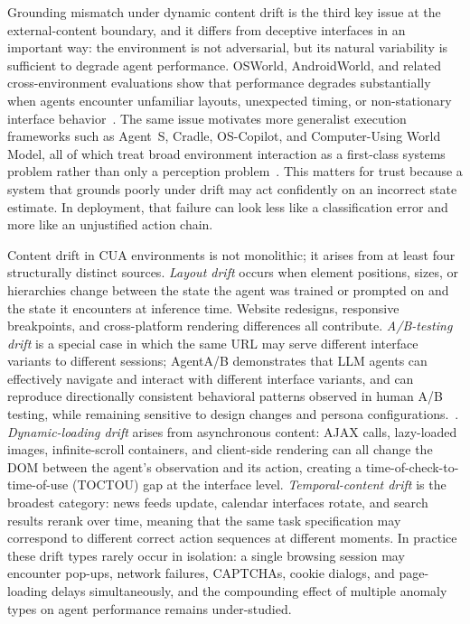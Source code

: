 Grounding mismatch under dynamic content drift is the third key issue at the external-content boundary, and it differs from deceptive interfaces in an important way: the environment is not adversarial, but its natural variability is sufficient to degrade agent performance. OSWorld, AndroidWorld, and related cross-environment evaluations show that performance degrades substantially when agents encounter unfamiliar layouts, unexpected timing, or non-stationary interface behavior~\cite{osworld2024,androidworld2024}. The same issue motivates more generalist execution frameworks such as Agent~S, Cradle, OS-Copilot, and Computer-Using World Model, all of which treat broad environment interaction as a first-class systems problem rather than only a perception problem~\cite{agents2024,cradle2024,oscopilot2024,cuwm2026}. This matters for trust because a system that grounds poorly under drift may act confidently on an incorrect state estimate. In deployment, that failure can look less like a classification error and more like an unjustified action chain.

Content drift in CUA environments is not monolithic; it arises from at least four structurally distinct sources. \emph{Layout drift} occurs when element positions, sizes, or hierarchies change between the state the agent was trained or prompted on and the state it encounters at inference time. Website redesigns, responsive breakpoints, and cross-platform rendering differences all contribute. \emph{A/B-testing drift} is a special case in which the same URL may serve different interface variants to different sessions; AgentA/B demonstrates that LLM agents can effectively navigate and interact with different interface variants, and can reproduce directionally consistent behavioral patterns observed in human A/B testing, while remaining sensitive to design changes and persona configurations.~\cite{agentab2025}. \emph{Dynamic-loading drift} arises from asynchronous content: AJAX calls, lazy-loaded images, infinite-scroll containers, and client-side rendering can all change the DOM between the agent's observation and its action, creating a time-of-check-to-time-of-use (TOCTOU) gap at the interface level. \emph{Temporal-content drift} is the broadest category: news feeds update, calendar interfaces rotate, and search results rerank over time, meaning that the same task specification may correspond to different correct action sequences at different moments. In practice these drift types rarely occur in isolation: a single browsing session may encounter pop-ups, network failures, CAPTCHAs, cookie dialogs, and page-loading delays simultaneously, and the compounding effect of multiple anomaly types on agent performance remains under-studied.

